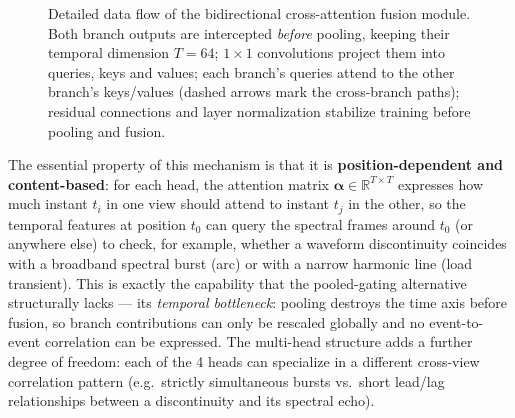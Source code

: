 \begin{figure}[H]
{%
}
\caption{Detailed data flow of the bidirectional cross-attention fusion module. Both branch outputs are intercepted \emph{before} pooling, keeping their temporal dimension $T = 64$; $1{\times}1$ convolutions project them into queries, keys and values; each branch's queries attend to the other branch's keys/values (dashed arrows mark the cross-branch paths); residual connections and layer normalization stabilize training before pooling and fusion.}
\label{fig:xattn-detail}
\end{figure}

The essential property of this mechanism is that it is \textbf{position-dependent and content-based}: for each head, the attention matrix $\boldsymbol{\alpha} \in \mathbb{R}^{T \times T}$ expresses how much instant $t_i$ in one view should attend to instant $t_j$ in the other, so the temporal features at position $t_0$ can query the spectral frames around $t_0$ (or anywhere else) to check, for example, whether a waveform discontinuity coincides with a broadband spectral burst (arc) or with a narrow harmonic line (load transient). This is exactly the capability that the pooled-gating alternative structurally lacks --- its \emph{temporal bottleneck}: pooling destroys the time axis before fusion, so branch contributions can only be rescaled globally and no event-to-event correlation can be expressed. The multi-head structure adds a further degree of freedom: each of the 4 heads can specialize in a different cross-view correlation pattern (e.g.\ strictly simultaneous bursts vs.\ short lead/lag relationships between a discontinuity and its spectral echo).

